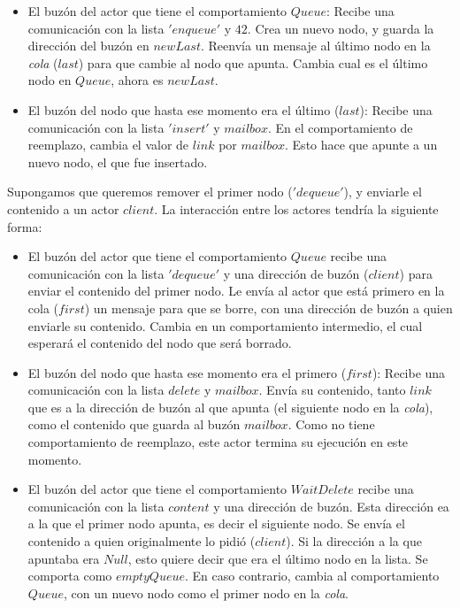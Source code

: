 \begin{itemize}
 \item El buzón del actor que tiene el comportamiento $Queue$:
 \subitem Recibe una comunicación con la lista $'enqueue'$ y $42$.
 \subitem Crea un nuevo nodo, y guarda la dirección del buzón en $newLast$.
 \subitem Reenvía un mensaje al último nodo en la \textit{cola} ($last$) para que cambie al nodo que apunta.
 \subitem Cambia cual es el último nodo en $Queue$, ahora es $newLast$.
 \item El buzón del nodo que hasta ese momento era el último ($last$):
 \subitem Recibe una comunicación con la lista $'insert'$ y $mailbox$.
 \subitem En el comportamiento de reemplazo, cambia el valor de $link$ por $mailbox$. Esto hace que apunte a un nuevo nodo, el que fue insertado.
\end{itemize}

Supongamos que queremos remover el primer nodo ($'dequeue'$), y enviarle el contenido a un actor $client$. La interacción entre los actores tendría la siguiente forma:

\begin{itemize}
 \item El buzón del actor que tiene el comportamiento $Queue$ recibe una comunicación con la lista $'dequeue'$ y una dirección de buzón ($client$) para enviar el contenido del primer nodo.
 \subitem Le envía al actor que está primero en la cola ($first$) un mensaje para que se borre, con una dirección de buzón a quien enviarle su contenido.
 \subitem Cambia en un comportamiento intermedio, el cual esperará el contenido del nodo que será borrado.
 \item El buzón del nodo que hasta ese momento era el primero ($first$):
 \subitem Recibe una comunicación con la lista $delete$ y $mailbox$.
 \subitem Envía su contenido, tanto $link$ que es a la dirección de buzón al que apunta (el siguiente nodo en la \textit{cola}), como el contenido que guarda al buzón $mailbox$. Como no tiene comportamiento de reemplazo, este actor termina su ejecución en este momento.
 \item El buzón del actor que tiene el comportamiento $WaitDelete$ recibe una comunicación con la lista $content$ y una dirección de buzón. Esta dirección ea a la que el primer nodo apunta, es decir el siguiente nodo.
 \subitem Se envía el contenido a quien originalmente lo pidió ($client$).
 \subitem Si la dirección a la que apuntaba era $Null$, esto quiere decir que era el último nodo en la lista. Se comporta como $emptyQueue$.
 \subitem En caso contrario, cambia al comportamiento $Queue$, con un nuevo nodo como el primer nodo en la \textit{cola}.
\end{itemize}


